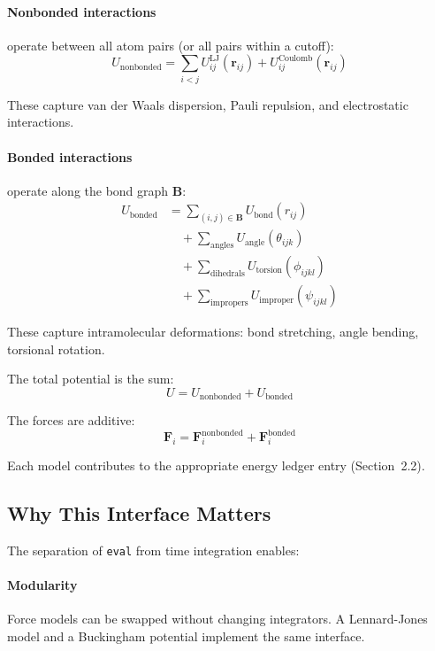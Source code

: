 \documentclass[11pt]{article}
\begin{document}
\paragraph{Nonbonded interactions} operate between all atom pairs (or all pairs within a cutoff):
\begin{equation}
U_{\text{nonbonded}} = \sum_{i<j} U_{ij}^{\text{LJ}}(\mathbf{r}_{ij}) + U_{ij}^{\text{Coulomb}}(\mathbf{r}_{ij})
\end{equation}

These capture van der Waals dispersion, Pauli repulsion, and electrostatic interactions.

\paragraph{Bonded interactions} operate along the bond graph $\mathbf{B}$:
\begin{align}
U_{\text{bonded}} &= \sum_{(i,j) \in \mathbf{B}} U_{\text{bond}}(r_{ij}) \\
&\quad + \sum_{\text{angles}} U_{\text{angle}}(\theta_{ijk}) \\
&\quad + \sum_{\text{dihedrals}} U_{\text{torsion}}(\phi_{ijkl}) \\
&\quad + \sum_{\text{impropers}} U_{\text{improper}}(\psi_{ijkl})
\end{align}

These capture intramolecular deformations: bond stretching, angle bending, torsional rotation.

The total potential is the sum:
\begin{equation}
U = U_{\text{nonbonded}} + U_{\text{bonded}}
\end{equation}

The forces are additive:
\begin{equation}
\mathbf{F}_i = \mathbf{F}_i^{\text{nonbonded}} + \mathbf{F}_i^{\text{bonded}}
\end{equation}

Each model contributes to the appropriate energy ledger entry (Section~2.2).

\subsection{Why This Interface Matters}

The separation of \texttt{eval} from time integration enables:

\paragraph{Modularity} Force models can be swapped without changing integrators. A Lennard-Jones model and a Buckingham potential implement the same interface.
\end{document}
